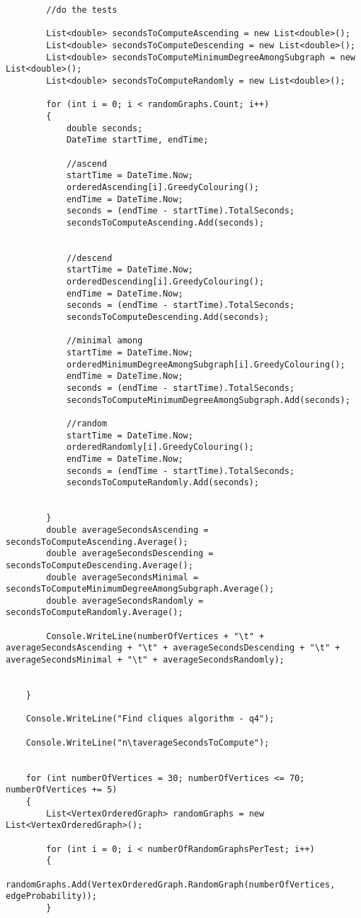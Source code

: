 \documentclass{article}
\begin{document}
\begin{lstlisting}
		//do the tests
		
		List<double> secondsToComputeAscending = new List<double>();
		List<double> secondsToComputeDescending = new List<double>();
		List<double> secondsToComputeMinimumDegreeAmongSubgraph = new List<double>();
		List<double> secondsToComputeRandomly = new List<double>();
		
		for (int i = 0; i < randomGraphs.Count; i++)
		{
			double seconds;
			DateTime startTime, endTime;
			
			//ascend
			startTime = DateTime.Now;
			orderedAscending[i].GreedyColouring();
			endTime = DateTime.Now;
			seconds = (endTime - startTime).TotalSeconds;
			secondsToComputeAscending.Add(seconds);
			
			
			//descend
			startTime = DateTime.Now;
			orderedDescending[i].GreedyColouring();
			endTime = DateTime.Now;
			seconds = (endTime - startTime).TotalSeconds;
			secondsToComputeDescending.Add(seconds);
			
			//minimal among
			startTime = DateTime.Now;
			orderedMinimumDegreeAmongSubgraph[i].GreedyColouring();
			endTime = DateTime.Now;
			seconds = (endTime - startTime).TotalSeconds;
			secondsToComputeMinimumDegreeAmongSubgraph.Add(seconds);
			
			//random
			startTime = DateTime.Now;
			orderedRandomly[i].GreedyColouring();
			endTime = DateTime.Now;
			seconds = (endTime - startTime).TotalSeconds;
			secondsToComputeRandomly.Add(seconds);
			
			
		}
		double averageSecondsAscending = secondsToComputeAscending.Average();
		double averageSecondsDescending = secondsToComputeDescending.Average();
		double averageSecondsMinimal = secondsToComputeMinimumDegreeAmongSubgraph.Average();
		double averageSecondsRandomly = secondsToComputeRandomly.Average();
		
		Console.WriteLine(numberOfVertices + "\t" + averageSecondsAscending + "\t" + averageSecondsDescending + "\t" + averageSecondsMinimal + "\t" + averageSecondsRandomly);
		
		
	}
	
	Console.WriteLine("Find cliques algorithm - q4");
	
	Console.WriteLine("n\taverageSecondsToCompute");
	
	
	for (int numberOfVertices = 30; numberOfVertices <= 70; numberOfVertices += 5)
	{
		List<VertexOrderedGraph> randomGraphs = new List<VertexOrderedGraph>();
		
		for (int i = 0; i < numberOfRandomGraphsPerTest; i++)
		{
			randomGraphs.Add(VertexOrderedGraph.RandomGraph(numberOfVertices, edgeProbability));
		}
		

\end{lstlisting}
\end{document}
